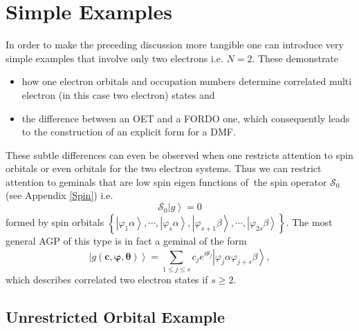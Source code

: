 \documentclass[aps,preprint]{revtex4}%
\begin{document}
\section{Simple Examples}

In order to make the preceding discussion more tangible one can introduce very
simple examples that involve only two electrons i.e. $N=2$. These demonstrate

\begin{itemize}
\item how one electron orbitals and occupation numbers determine correlated
multi electron (in this case two electron) states and

\item the difference between an OET and a FORDO one, which consequently leads
to the construction of an explicit form for a DMF.
\end{itemize}

These subtle differences can even be observed when one restricts attention to
spin orbitals or even orbitals for the two electron systems. Thus we can
restrict attention to geminals that are low spin eigen functions of $\ $the
spin operator $\mathcal{S}_{0}$ (see Appendix \ref{Spin}) i.e.
\begin{equation}
\mathcal{S}_{0}\left\vert g\right\rangle =0
\end{equation}
formed by spin orbitals $\left\{  \left\vert \varphi_{1}\alpha\right\rangle
,\cdots,\left\vert \varphi_{s}\alpha\right\rangle ,\left\vert \varphi
_{s+1}\beta\right\rangle ,\cdots,\left\vert \varphi_{2s}\beta\right\rangle
\right\}  $. The most general AGP of this type is in fact a geminal of the
form%
\begin{equation}
\left\vert g\left(  \boldsymbol{c},\boldsymbol{\varphi},\boldsymbol{\theta
}\right)  \right\rangle =\sum_{1\leq j\leq s}c_{j}e^{i\theta_{j}}\left\vert
\varphi_{j}\alpha\varphi_{j+s}\beta\right\rangle ,\label{spinorbgem}%
\end{equation}
which describes correlated two electron states if $s\geq2$.

\subsection{Unrestricted Orbital Example}
\end{document}
